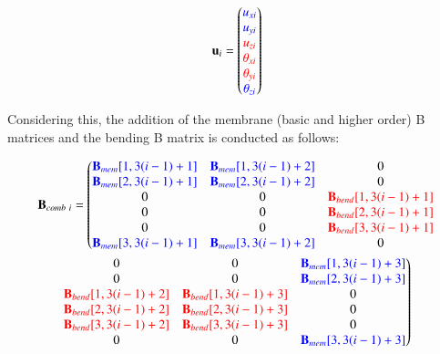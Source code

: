 \begin{equation} 
\mathbf{u}_i = 
\begin{pmatrix}
\textcolor{blue}{u_{xi}} \\ 
\textcolor{blue}{u_{yi}} \\ 
\textcolor{red}{u_{zi}} \\ 
\textcolor{red}{\theta_{xi}} \\ 
\textcolor{red}{\theta_{yi}} \\ 
\textcolor{blue}{\theta_{zi}} \\ 
\end{pmatrix}
\label{equation32}
\end{equation}

Considering this, the addition of the membrane (basic and higher order) B matrices and the bending B matrix is conducted as follows:

\begin{multline}
	\mathbf{B}_{comb\ i} = \left(
	\begin{matrix}
		\textcolor{blue}{\mathbf{B}_{mem}[1,3(i-1) + 1]} & \textcolor{blue}{\mathbf{B}_{mem}[1,3(i-1) + 2]} & 0 \\ 
		\textcolor{blue}{\mathbf{B}_{mem}[2,3(i-1) + 1]} & \textcolor{blue}{\mathbf{B}_{mem}[2,3(i-1) + 2]} & 0 \\ 
		0 & 0 & \textcolor{red}{\mathbf{B}_{bend}[1,3(i-1) + 1]} \\ 
		0 & 0 & \textcolor{red}{\mathbf{B}_{bend}[2,3(i-1) + 1]} \\
		0 & 0 & \textcolor{red}{\mathbf{B}_{bend}[3,3(i-1) + 1]} \\
		\textcolor{blue}{\mathbf{B}_{mem}[3,3(i-1) + 1]} & \textcolor{blue}{\mathbf{B}_{mem}[3,3(i-1) + 2]} & 0 \\
	\end{matrix}\right.                
	\\
	\left.
	\begin{matrix}
		0 & 0 & \textcolor{blue}{\mathbf{B}_{mem}[1,3(i-1) + 3]} \\ 
		0 & 0 & \textcolor{blue}{\mathbf{B}_{mem}[2,3(i-1) + 3]} \\ 
		\textcolor{red}{\mathbf{B}_{bend}[1,3(i-1) + 2]} & \textcolor{red}{\mathbf{B}_{bend}[1,3(i-1) + 3]} & 0 \\ 
		\textcolor{red}{\mathbf{B}_{bend}[2,3(i-1) + 2]} & \textcolor{red}{\mathbf{B}_{bend}[2,3(i-1) + 3]} & 0 \\
		\textcolor{red}{\mathbf{B}_{bend}[3,3(i-1) + 2]} & \textcolor{red}{\mathbf{B}_{bend}[3,3(i-1) + 3]} & 0 \\
		0 & 0 & \textcolor{blue}{\mathbf{B}_{mem}[3,3(i-1) + 3]} \\
	\end{matrix}\right)
	\label{equation33}
\end{multline}







